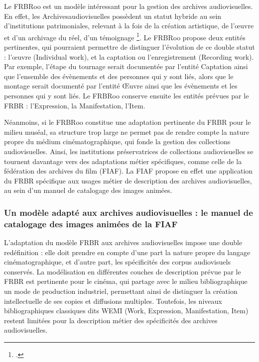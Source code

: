 Le \gls{FRBRoo} est un modèle intéressant pour la gestion des archives audiovisuelles. En effet, les \gls{Archivesaudiovisuelles} possèdent un statut hybride au sein d’institutions patrimoniales, relevant à la fois de la création artistique, de l’œuvre et d’un archivage du réel, d’un témoignage \footcite{zotero-item-669}. Le \gls{FRBRoo} propose deux entités pertinentes, qui pourraient permettre de distinguer l’évolution de ce double statut : l’œuvre (Individual work), et la captation ou l’enregistrement (Recording work). Par exemple, l’étape du tournage serait documentée par l’entité Captation ainsi que l'ensemble des évènements et des personnes qui y sont liés, alors que le montage serait documenté par l’entité Œuvre ainsi que les évènements et les personnes qui y sont liés. Le FRBRoo conserve ensuite les entités prévues par le FRBR : l’Expression, la Manifestation, l’Item.  

Néanmoins, si le FRBRoo constitue une adaptation pertinente du FRBR pour le milieu muséal, sa structure trop large ne permet pas de rendre compte la nature propre du médium cinématographique, qui fonde la gestion des collections audiovisuelles. Ainsi, les institutions préservatrices de collections audiovisuelles se tournent davantage vers des adaptations métier spécifiques, comme celle de la fédération des archives du film (FIAF). La FIAF propose en effet une application du FRBR spécifique aux usages métier de description des archives audiovisuelles, au sein d’un manuel de catalogage des images animées. 



\subsubsection{Un modèle adapté aux archives audiovisuelles : le manuel de catalogage des images animées de la FIAF } 

L’adaptation du modèle FRBR aux archives audiovisuelles impose une double redéfinition : elle doit prendre en compte d’une part la nature propre du langage cinématographique, et d’autre part, les spécificités des corpus audiovisuels conservés. La modélisation en différentes couches de description prévue par le FRBR est pertinente pour le cinéma, qui partage avec le milieu bibliographique un mode de production industriel, permettant ainsi de distinguer la création intellectuelle de ses copies et diffusions multiples. Toutefois, les niveaux bibliographiques classiques dits WEMI (Work, Expression, Manifestation, Item) restent limitées pour la description métier des spécificités des archives audiovisuelles.  


